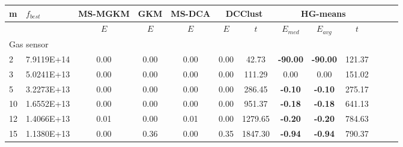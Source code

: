 {\footnotesize
\centering
\begin{longtable}{@{}llccccccccccc@{}}
\hline
\multicolumn{1}{l|}{m}  & \multicolumn{1}{l|}{$f_{best}$} & \multicolumn{1}{c|}{MS-MGKM} & \multicolumn{1}{c|}{GKM}  & \multicolumn{1}{c|}{MS-DCA} & \multicolumn{2}{c|}{DCClust}         & \multicolumn{3}{c}{HG-means}                      \\ \hline
                        & \multicolumn{1}{l|}{}           & \multicolumn{1}{c|}{$E$}     & \multicolumn{1}{c|}{$E$}  & \multicolumn{1}{c|}{$E$}    & $E$  & \multicolumn{1}{c|}{$t$}      & $E_{med}$       & $E_{avg}$       & $t$       \\ \hline
\multicolumn{10}{l}{Gas sensor}                                                                                                                                                                                                           \\ \hline
\multicolumn{1}{l|}{2}  & \multicolumn{1}{l|}{7.9119E+14} & \multicolumn{1}{c|}{0.00}    & \multicolumn{1}{c|}{0.00} & \multicolumn{1}{c|}{0.00}   & 0.00 & \multicolumn{1}{c|}{42.73}    & \textbf{-90.00} & \textbf{-90.00} & 121.37    \\
\multicolumn{1}{l|}{3}  & \multicolumn{1}{l|}{5.0241E+13} & \multicolumn{1}{c|}{0.00}    & \multicolumn{1}{c|}{0.00} & \multicolumn{1}{c|}{0.00}   & 0.00 & \multicolumn{1}{c|}{111.29}   & 0.00            & 0.00            & 151.02    \\
\multicolumn{1}{l|}{5}  & \multicolumn{1}{l|}{3.2273E+13} & \multicolumn{1}{c|}{0.00}    & \multicolumn{1}{c|}{0.00} & \multicolumn{1}{c|}{0.00}   & 0.00 & \multicolumn{1}{c|}{286.45}   & \textbf{-0.10}  & \textbf{-0.10}  & 275.17    \\
\multicolumn{1}{l|}{10} & \multicolumn{1}{l|}{1.6552E+13} & \multicolumn{1}{c|}{0.00}    & \multicolumn{1}{c|}{0.00} & \multicolumn{1}{c|}{0.00}   & 0.00 & \multicolumn{1}{c|}{951.37}   & \textbf{-0.18}  & \textbf{-0.18}  & 641.13    \\
\multicolumn{1}{l|}{12} & \multicolumn{1}{l|}{1.4066E+13} & \multicolumn{1}{c|}{0.01}    & \multicolumn{1}{c|}{0.00} & \multicolumn{1}{c|}{0.01}   & 0.00 & \multicolumn{1}{c|}{1279.65}  & \textbf{-0.20}  & \textbf{-0.20}  & 784.63    \\
\multicolumn{1}{l|}{15} & \multicolumn{1}{l|}{1.1380E+13} & \multicolumn{1}{c|}{0.00}    & \multicolumn{1}{c|}{0.36} & \multicolumn{1}{c|}{0.00}   & 0.35 & \multicolumn{1}{c|}{1847.30}  & \textbf{-0.94}  & \textbf{-0.94}  & 790.37    \\

\end{longtable}}
